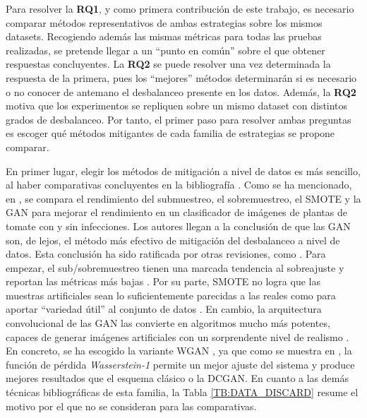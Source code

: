 Para resolver la \textbf{RQ1}, y como primera contribución de este trabajo, es necesario comparar métodos representativos de ambas estrategias sobre los mismos datasets. Recogiendo además las mismas métricas para todas las pruebas realizadas, se pretende llegar a un ``punto en común'' sobre el que obtener respuestas concluyentes. La \textbf{RQ2} se puede resolver una vez determinada la respuesta de la primera, pues los ``mejores'' métodos determinarán si es necesario o no conocer de antemano el desbalanceo presente en los datos. Además, la \textbf{RQ2} motiva que los experimentos se repliquen sobre un mismo dataset con distintos grados de desbalanceo. Por tanto, el primer paso para resolver ambas preguntas es escoger qué métodos mitigantes de cada familia de estrategias se propone comparar.

En primer lugar, elegir los métodos de mitigación a nivel de datos es más sencillo, al haber comparativas concluyentes en la bibliografía \cite{upadhyay2021state,nafi2020addressing}. Como se ha mencionado, en \citet{nafi2020addressing}, se compara el rendimiento del submuestreo, el sobremuestreo, el SMOTE y la GAN para mejorar el rendimiento en un clasificador de imágenes de plantas de tomate con y sin infecciones. Los autores llegan a la conclusión de que las GAN son, de lejos, el método más efectivo de mitigación del desbalanceo a nivel de datos. Esta conclusión ha sido ratificada por otras revisiones, como \citet{johnson2019survey}. Para empezar, el sub/sobremuestreo tienen una marcada tendencia al sobreajuste y reportan las métricas más bajas \cite{johnson2019survey, upadhyay2021state, nafi2020addressing}. Por su parte, SMOTE no logra que las muestras artificiales sean lo suficientemente parecidas a las reales como para aportar ``variedad útil'' al conjunto de datos \cite{nafi2020addressing}. En cambio, la arquitectura convolucional de las GAN las convierte en algoritmos mucho más potentes, capaces de generar imágenes artificiales con un sorprendente nivel de realismo \cite{johnson2019survey}. En concreto, se ha escogido la variante WGAN \cite{arjovsky2017wasserstein}, ya que como se muestra en \citet{nafi2020addressing}, la función de pérdida \textit{Wasserstein-1} permite un mejor ajuste del sistema y produce mejores resultados que el esquema clásico o la DCGAN. En cuanto a las demás técnicas bibliográficas de esta familia, la Tabla \ref{TB:DATA_DISCARD} resume el motivo por el que no se consideran para las comparativas.

